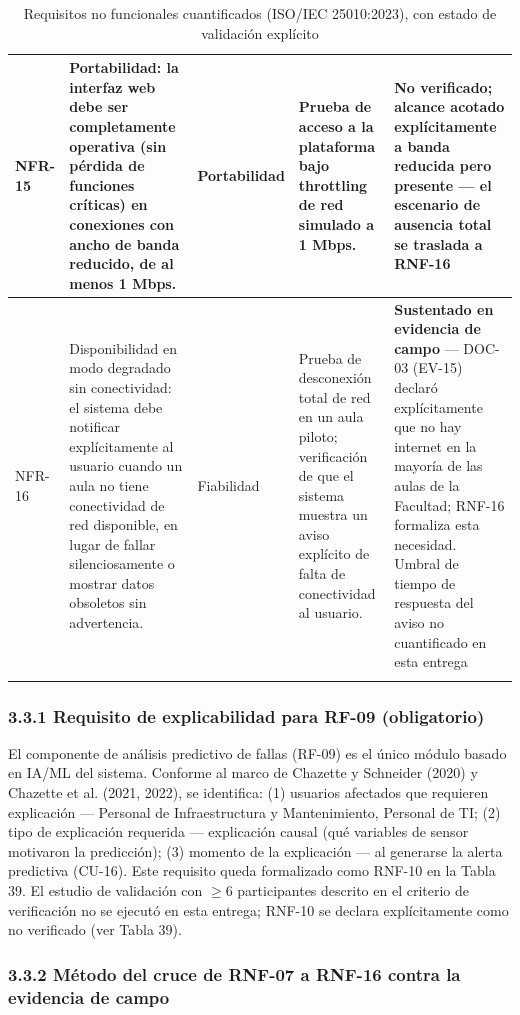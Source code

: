 \begin{longtable}{|p{2.6cm}|p{5.4cm}|p{2.4cm}|p{2.6cm}|p{2.9cm}|}
NFR-15 & Portabilidad: la interfaz web debe ser completamente operativa (sin pérdida de funciones críticas) en conexiones con ancho de banda reducido, de al menos 1 Mbps. & Portabilidad & Prueba de acceso a la plataforma bajo throttling de red simulado a 1 Mbps. & \textbf{No verificado}; alcance acotado explícitamente a banda reducida pero presente --- el escenario de ausencia total se traslada a RNF-16 \\ \hline
NFR-16 & Disponibilidad en modo degradado sin conectividad: el sistema debe notificar explícitamente al usuario cuando un aula no tiene conectividad de red disponible, en lugar de fallar silenciosamente o mostrar datos obsoletos sin advertencia. & Fiabilidad & Prueba de desconexión total de red en un aula piloto; verificación de que el sistema muestra un aviso explícito de falta de conectividad al usuario. & \textbf{Sustentado en evidencia de campo} --- DOC-03 (EV-15) declaró explícitamente que no hay internet en la mayoría de las aulas de la Facultad; RNF-16 formaliza esta necesidad. Umbral de tiempo de respuesta del aviso no cuantificado en esta entrega \\ \hline
\caption{Requisitos no funcionales cuantificados (ISO/IEC 25010:2023), con estado de validación explícito}
\end{longtable}
\endgroup

\subsubsection*{3.3.1 Requisito de explicabilidad para RF-09 (obligatorio)}


El componente de análisis predictivo de fallas (RF-09) es el único módulo basado en IA/ML del sistema. Conforme al marco de Chazette y Schneider (2020) y Chazette et al. (2021, 2022), se identifica: (1) usuarios afectados que requieren explicación --- Personal de Infraestructura y Mantenimiento, Personal de TI; (2) tipo de explicación requerida --- explicación causal (qué variables de sensor motivaron la predicción); (3) momento de la explicación --- al generarse la alerta predictiva (CU-16). Este requisito queda formalizado como RNF-10 en la Tabla 39. El estudio de validación con $\geq$6 participantes descrito en el criterio de verificación no se ejecutó en esta entrega; RNF-10 se declara explícitamente como no verificado (ver Tabla 39).


\subsubsection*{3.3.2 Método del cruce de RNF-07 a RNF-16 contra la evidencia de campo}

